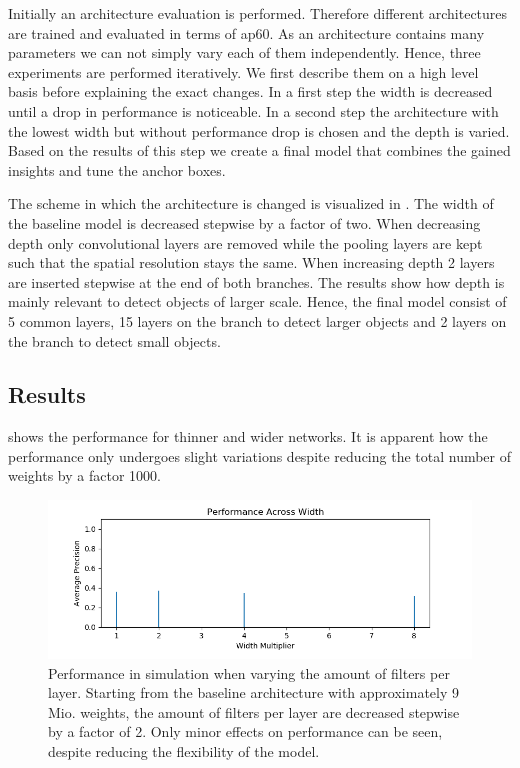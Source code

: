 Initially an architecture evaluation is performed. Therefore different architectures are trained and evaluated in terms of \ac{ap60}. As an architecture contains many parameters we can not simply vary each of them independently. Hence, three experiments are performed iteratively. We first describe them on a high level basis before explaining the exact changes. In a first step the width is decreased until a drop in performance is noticeable. In a second step the architecture with the lowest width but without performance drop is chosen and the depth is varied. Based on the results of this step we create a final model that combines the gained insights and tune the anchor boxes.

The scheme in which the architecture is changed is visualized in . The width of the baseline model is decreased stepwise by a factor of two. When decreasing depth only convolutional layers are removed while the pooling layers are kept such that the spatial resolution stays the same. When increasing depth 2 layers are inserted stepwise at the end of both branches. The results show how depth is mainly relevant to detect objects of larger scale. Hence, the final model consist of 5 common layers, 15 layers on the branch to detect larger objects and 2 layers on the branch to detect small objects.





\subsection{Results}

 shows the performance for thinner and wider networks. It is apparent how the performance only undergoes slight variations despite reducing the total number of weights by a factor 1000. 


\begin{figure}[hbtp]
	\centering
	\includegraphics[width=\textwidth]{fig/perf_width}
	\caption{Performance in simulation when varying the amount of filters per layer. Starting from the baseline architecture with approximately 9 Mio. weights, the amount of filters per layer are decreased stepwise by a factor of 2. Only minor effects on performance can be seen, despite reducing the flexibility of the model.}
	\label{fig:perf_width}
\end{figure}

